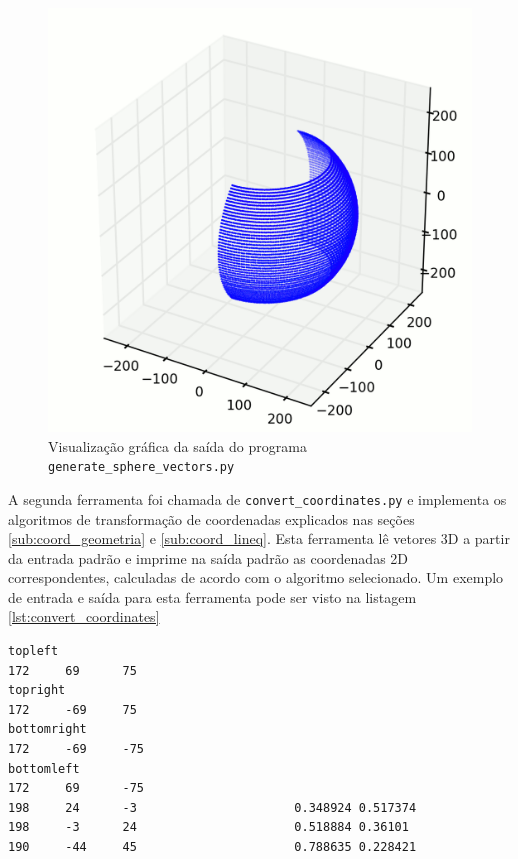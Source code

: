 \documentclass[brazil,pagestart=firstchapter]{abnt}
\begin{document}
\begin{figure}[h]
\centering
\includegraphics{img/half_sphere.png}
\caption{Visualização gráfica da saída do programa \texttt{generate\_sphere\_vectors.py}}
\label{fig:half_sphere}
\end{figure}

A segunda ferramenta foi chamada de \texttt{convert\_coordinates.py} e
implementa os algoritmos de transformação de coordenadas explicados nas
seções \ref{sub:coord_geometria} e \ref{sub:coord_lineq}.  Esta ferramenta
lê vetores 3D a partir da entrada padrão e imprime na saída padrão as
coordenadas 2D correspondentes, calculadas de acordo com o algoritmo
selecionado. Um exemplo de entrada e saída para esta ferramenta pode ser
visto na listagem \ref{lst:convert_coordinates}

\begin{lstlisting}[numbers=none, float=h, label={lst:convert_coordinates},
caption={Entrada para o programa \texttt{convert\_coordinates.py}, e a saída correspondente}
]
topleft
172     69      75
topright
172     -69     75
bottomright
172     -69     -75
bottomleft
172     69      -75
198     24      -3                      0.348924 0.517374
198     -3      24                      0.518884 0.36101
190     -44     45                      0.788635 0.228421
\end{lstlisting}
\end{document}
